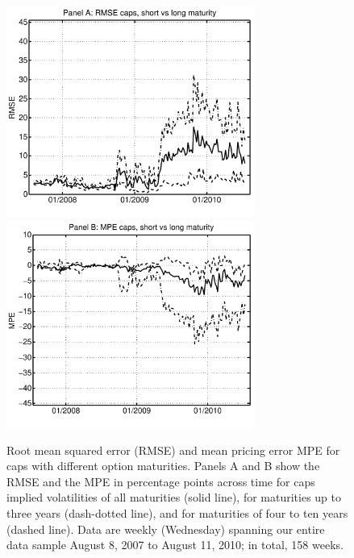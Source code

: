 \begin{figure}[t!]
    \begin{center}
      \includegraphics[width=3.20in]{Graphics/RMSE_ivcapsjoint.pdf}
      \includegraphics[width=3.20in]{Graphics/MPE_ivcapsjoint.pdf}
    \end{center}
      \caption[RMSE and  MPE for Caps with Different Maturities]{Root mean squared error (RMSE) and mean pricing error MPE for caps with different option maturities.
    Panels A and B show the RMSE and the MPE in percentage points  across time for caps implied volatilities
    of all maturities (solid line), for maturities up to three years (dash-dotted line), and for maturities of four to ten years (dashed line). Data are
    weekly (Wednesday) spanning our entire data sample August 8, 2007 to
    August 11, 2010; in total, 158 weeks.}\label{fig:fig2}
\end{figure}